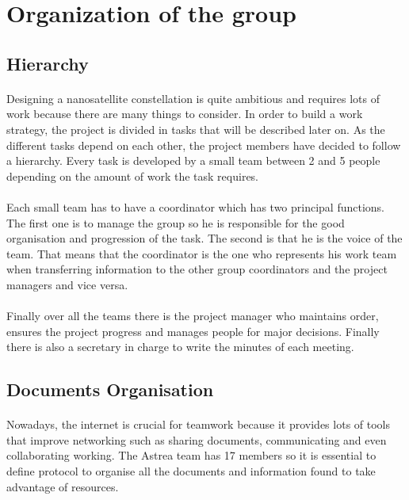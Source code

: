 \documentclass[12pt, titlepage]{scrartcl}
\begin{document}
\section{Organization of the group}


\subsection{Hierarchy}
\paragraph{}
Designing a nanosatellite constellation is quite ambitious and requires lots of work because there are many things to consider. In order to build a work strategy, the project is divided in tasks that will be described later on. As the different tasks depend on each other, the project members have decided to follow a hierarchy. Every task is developed by a small team between 2 and 5 people depending on the amount of work the task requires.
\paragraph{}
Each small team has to have a coordinator which has two principal functions. The first one is to manage the group so he is responsible for the good organisation and progression of the task. The second is that he is the voice of the team. That means that the coordinator is the one who represents his work team when transferring information to the other group coordinators and the project managers and vice versa. 
\paragraph{}
Finally over all the teams there is the project manager who maintains order, ensures the project progress and manages people for major decisions. Finally there is also a secretary in charge to write the minutes of each meeting.


\subsection{Documents Organisation}
\paragraph{}
Nowadays, the internet is crucial for teamwork because it provides lots of tools that improve networking such as sharing documents, communicating and even collaborating working. The Astrea team has 17 members so it is essential to define protocol to organise all the documents and information found to take advantage of resources. 
\end{document}
